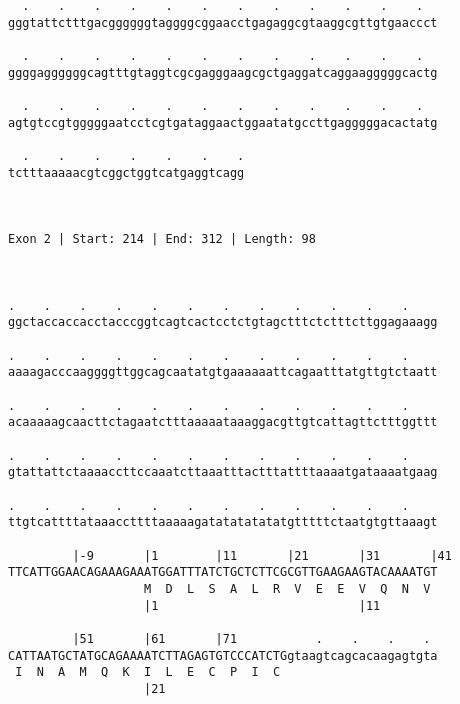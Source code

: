 \documentclass{article}
\begin{document}
\begin{Verbatim}
  .    .    .    .    .    .    .    .    .    .    .    .  
gggtattctttgacggggggtaggggcggaacctgagaggcgtaaggcgttgtgaaccct
                                                            
  .    .    .    .    .    .    .    .    .    .    .    .  
ggggaggggggcagtttgtaggtcgcgagggaagcgctgaggatcaggaagggggcactg
                                                            
  .    .    .    .    .    .    .    .    .    .    .    .  
agtgtccgtgggggaatcctcgtgataggaactggaatatgccttgagggggacactatg
                                                            
  .    .    .    .    .    .    .
tctttaaaaacgtcggctggtcatgaggtcagg
                                 
                                 
 
Exon 2 | Start: 214 | End: 312 | Length: 98



.    .    .    .    .    .    .    .    .    .    .    .    
ggctaccaccacctacccggtcagtcactcctctgtagctttctctttcttggagaaagg
                                                            
.    .    .    .    .    .    .    .    .    .    .    .    
aaaagacccaaggggttggcagcaatatgtgaaaaaattcagaatttatgttgtctaatt
                                                            
.    .    .    .    .    .    .    .    .    .    .    .    
acaaaaagcaacttctagaatctttaaaaataaaggacgttgtcattagttctttggttt
                                                            
.    .    .    .    .    .    .    .    .    .    .    .    
gtattattctaaaaccttccaaatcttaaatttactttattttaaaatgataaaatgaag
                                                            
.    .    .    .    .    .    .    .    .    .    .    .    
ttgtcattttataaaccttttaaaaagatatatatatatgtttttctaatgtgttaaagt
                                                            
         |-9       |1        |11       |21       |31       |41
TTCATTGGAACAGAAAGAAATGGATTTATCTGCTCTTCGCGTTGAAGAAGTACAAAATGT
                   M  D  L  S  A  L  R  V  E  E  V  Q  N  V 
                   |1                            |11        
  
         |51       |61       |71           .    .    .    . 
CATTAATGCTATGCAGAAAATCTTAGAGTGTCCCATCTGgtaagtcagcacaagagtgta
 I  N  A  M  Q  K  I  L  E  C  P  I  C                      
                   |21                                      
  

\end{Verbatim}
\end{document}
